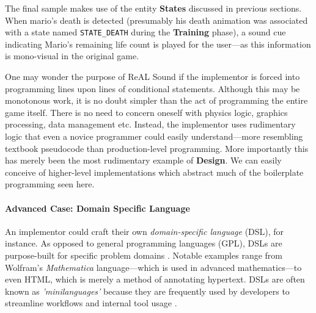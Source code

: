 \documentclass{report}
\newcommand{\rs}{ReAL Sound\xspace}
\newcommand{\train}{\textbf{Training}\xspace}
\newcommand{\design}{\textbf{Design}\xspace}
\newcommand{\state}[1]{\textbf{#1}}
\newcommand{\imp}{implementor\xspace}
\begin{document}
The final sample makes use of the entity \state{States} discussed in previous sections. When mario's death is detected (presumably his death animation was associated with a state named \texttt{STATE\_DEATH} during the \train phase), a sound cue indicating Mario's remaining life count is played for the user---as this information is mono-visual in the original game. 


One may wonder the purpose of \rs if the \imp is forced into programming lines upon lines of conditional statements. Although this may be monotonous work, it is no doubt simpler than the act of programming the entire game itself. There is no need to concern oneself with physics logic, graphics processing, data management etc. Instead, the \imp uses rudimentary logic that even a novice programmer could easily understand---more resembling textbook pseudocode than production-level programming. More importantly this has merely been the most rudimentary example of \design. We can easily conceive of higher-level implementations which abstract much of the boilerplate programming seen here. 

\paragraph{Advanced Case: Domain Specific Language}
An \imp could craft their own \emph{domain-specific language} (DSL), for instance. As opposed to general programming languages (GPL), DSLs are purpose-built for specific problem domains \cite{DSL}. Notable examples range from Wolfram's \emph{Mathematica} language---which is used in advanced mathematics---to even HTML, which is merely a method of annotating hypertext. DSLs are often known as \emph{'minilanguages'} because they are frequently used by developers to streamline workflows and internal tool usage \cite{UnixProg}. 
\end{document}
